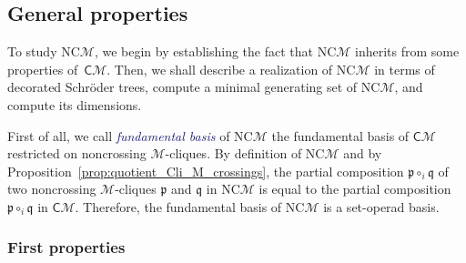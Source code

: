 \documentclass[10pt,reqno]{amsart}
\numberwithin{equation}{subsection}
\newcommand{\Mca}{\mathcal{M}}
\newcommand{\Pfr}{\mathfrak{p}}
\newcommand{\Qfr}{\mathfrak{q}}
\newcommand{\Cli}{\mathsf{C}}
\newcommand{\NC}{\mathrm{NC}}
\newcommand{\Def}[1]{\textcolor{MidnightBlue}{\em #1}}
\begin{document}
\subsection{General properties}
To study $\NC\Mca$, we begin by establishing the fact that $\NC\Mca$
inherits from some properties of~$\Cli\Mca$. Then, we shall describe a
realization of $\NC\Mca$ in terms of decorated Schröder trees, compute a
minimal generating set of $\NC\Mca$, and compute its dimensions.
\medskip

First of all, we call \Def{fundamental basis} of $\NC\Mca$ the
fundamental basis of $\Cli\Mca$ restricted on noncrossing
$\Mca$-cliques. By definition of $\NC\Mca$ and by
Proposition~\ref{prop:quotient_Cli_M_crossings}, the partial composition
$\Pfr \circ_i \Qfr$ of two noncrossing $\Mca$-cliques $\Pfr$ and $\Qfr$
in $\NC\Mca$ is equal to the partial composition $\Pfr \circ_i \Qfr$ in
$\Cli\Mca$. Therefore, the fundamental basis of $\NC\Mca$ is a
set-operad basis.
\medskip

\subsubsection{First properties}
\end{document}
